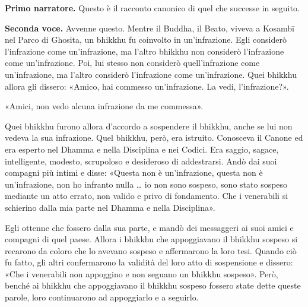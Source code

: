 \textbf{Primo narratore.} Questo è il racconto canonico di quel che successe in
seguito.


\textbf{Seconda voce.} Avvenne questo. Mentre il Buddha, il Beato, viveva a
Kosambī nel Parco di Ghosita, un bhikkhu fu coinvolto in un’infrazione.
Egli considerò l’infrazione come un’infrazione, ma l’altro bhikkhu non
considerò l’infrazione come un’infrazione. Poi, lui stesso non considerò
quell’infrazione come un’infrazione, ma l’altro considerò l’infrazione
come un’infrazione. Quei bhikkhu allora gli dissero: «Amico, hai
commesso un’infrazione. La vedi, l’infrazione?».


«Amici, non vedo alcuna infrazione da me commessa».


Quei bhikkhu furono allora d’accordo a sospendere il bhikkhu, anche se
lui non vedeva la sua infrazione. Quel bhikkhu, però, era istruito.
Conosceva il Canone ed era esperto nel Dhamma e nella Disciplina e nei
Codici. Era saggio, sagace, intelligente, modesto, scrupoloso e
desideroso di addestrarsi. Andò dai suoi compagni più intimi e disse:
«Questa non è un’infrazione, questa non è un’infrazione, non ho infranto
nulla …​ io non sono sospeso, sono stato sospeso mediante un atto
errato, non valido e privo di fondamento. Che i venerabili si schierino
dalla mia parte nel Dhamma e nella Disciplina».


Egli ottenne che fossero dalla sua parte, e mandò dei messaggeri ai suoi
amici e compagni di quel paese. Allora i bhikkhu che appoggiavano il
bhikkhu sospeso si recarono da coloro che lo avevano sospeso e
affermarono la loro tesi. Quando ciò fu fatto, gli altri confermarono la
validità del loro atto di sospensione e dissero: «Che i venerabili non
appoggino e non seguano un bhikkhu sospeso». Però, benché ai bhikkhu che
appoggiavano il bhikkhu sospeso fossero state dette queste parole, loro
continuarono ad appoggiarlo e a seguirlo.


